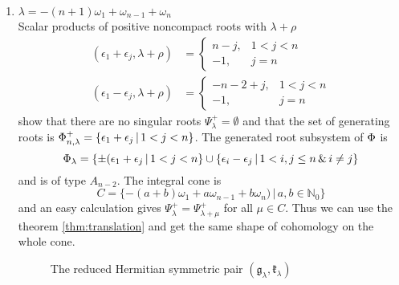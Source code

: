 \begin{enumerate}
 \item $ \lambda = -(n+1)\omega_1 +\omega_{n-1} + \omega_n$\\
   Scalar products of positive noncompact roots with $\lambda+\rho$ 
  \begin{align*}
    (\epsilon_1 + \epsilon_j, \lambda+\rho) & = \begin{cases}
                                                 n-j, & 1<j < n \\
                                                 -1, & j = n
                                                \end{cases}\\
    (\epsilon_1 - \epsilon_j, \lambda+\rho) & = \begin{cases}
                                                 -n-2+j, & 1<j < n \\
                                                 -1, & j = n
                                                \end{cases}
  \end{align*}
  show that there are no singular roots $\Psi^+_\lambda = \emptyset$ and that the set of generating roots is $\Phi^+_{n,\lambda} = \{\epsilon_1 + \epsilon_j \,|\, 1<j<n \}$. The generated root subsystem of $\Phi$ is
  \[
    \Phi_\lambda = \{ \pm(\epsilon_1 + \epsilon_j \,|\, 1<j < n \} \cup \{ \epsilon_i - \epsilon_j \,|\, 1 < i,j \leq n \,\&\, i\neq j \}
  \]
  and is of type $A_{n-2}$. The integral cone is
  \[
   C = \{-(a+b)\omega_1 + a\omega_{n-1} + b\omega_n) \,|\, a,b\in\mathbb{N}_0 \}
  \]
  and an easy calculation gives $\Psi^+_\lambda = \Psi^+_{\lambda+\mu}$ for all $\mu \in C$. Thus we can use the theorem \ref{thm:translation} and get the same shape of cohomology on the whole cone.
  
\begin{figure}[H]
  \centering
{}  
  \caption{The reduced Hermitian symmetric pair $(\mathfrak{g}_\lambda, \mathfrak{k}_\lambda)$}
\end{figure}  


\end{enumerate}

